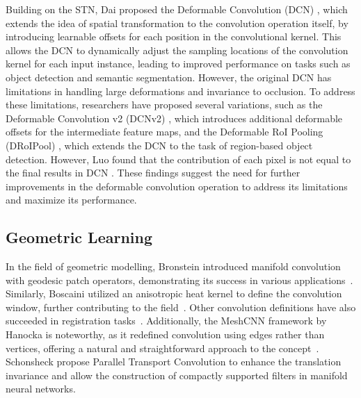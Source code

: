 Building on the STN, Dai \etal proposed the Deformable Convolution (DCN) \cite{dai2017deformable}, which extends the idea of spatial transformation to the convolution operation itself, by introducing learnable offsets for each position in the convolutional kernel. This allows the DCN to dynamically adjust the sampling locations of the convolution kernel for each input instance, leading to improved performance on tasks such as object detection and semantic segmentation. However, the original DCN has limitations in handling large deformations and invariance to occlusion. To address these limitations, researchers have proposed several variations, such as the Deformable Convolution v2 (DCNv2) \cite{zhu2019deformable}, which introduces additional deformable offsets for the intermediate feature maps, and the Deformable RoI Pooling (DRoIPool) \cite{dai2017deformable}, which extends the DCN to the task of region-based object detection. However, Luo \etal found that the contribution of each pixel is not equal to the final results in DCN \cite{luo2016understanding}. These findings suggest the need for further improvements in the deformable convolution operation to address its limitations and maximize its performance.

\subsection{Geometric Learning}
In the field of geometric modelling, Bronstein \etal introduced manifold convolution with geodesic patch operators, demonstrating its success in various applications~\cite{bronstein2017geometric, masci2015geodesic}. Similarly, Boscaini \etal utilized an anisotropic heat kernel to define the convolution window, further contributing to the field~\cite{boscaini2016learning}. Other convolution definitions have also succeeded in registration tasks~\cite{bouritsas2019neural, gong2019spiralnet++}. Additionally, the MeshCNN framework by Hanocka \etal is noteworthy, as it redefined convolution using edges rather than vertices, offering a natural and straightforward approach to the concept~\cite{hanocka2019meshcnn}. Schonsheck \etal propose \cite{schonsheck2022parallel} Parallel Transport Convolution to enhance the translation invariance and allow the construction of compactly supported filters in manifold neural networks.
